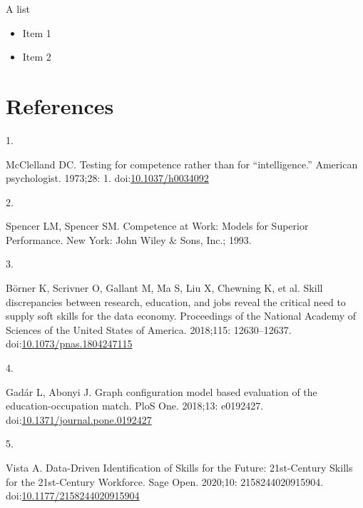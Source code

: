 \documentclass[10pt,letterpaper]{article}
\providecommand{\tightlist}{%
  \setlength{\itemsep}{0pt}\setlength{\parskip}{0pt}}
\newlength{\cslhangindent}
\newlength{\csllabelwidth}
\newenvironment{CSLReferences}[2] %
 {\begin{list}{}{%
  \setlength{\itemindent}{0pt}
  \setlength{\leftmargin}{0pt}
  \setlength{\parsep}{0pt}
  \ifodd #1
   \setlength{\leftmargin}{\cslhangindent}
   \setlength{\itemindent}{-1\cslhangindent}
  \fi
  \setlength{\itemsep}{#2\baselineskip}}}
 {\end{list}}
\newcommand{\CSLLeftMargin}[1]{\parbox[t]{\csllabelwidth}{#1}}
\newcommand{\CSLRightInline}[1]{\parbox[t]{\linewidth - \csllabelwidth}{#1}\break}
\begin{document}
A list

\begin{itemize}
\tightlist
\item
  Item 1
\item
  Item 2
\end{itemize}

\section*{References}\label{references}

\label{refs}
\begin{CSLReferences}{0}{1}
\CSLLeftMargin{1. }%
\CSLRightInline{McClelland DC. Testing for competence rather than for
{``intelligence.''} American psychologist. 1973;28: 1.
doi:\href{https://doi.org/10.1037/h0034092}{10.1037/h0034092}}

\CSLLeftMargin{2. }%
\CSLRightInline{Spencer LM, Spencer SM. {Competence at Work: Models for
Superior Performance}. New York: John Wiley \& Sons, Inc.; 1993. }

\CSLLeftMargin{3. }%
\CSLRightInline{Börner K, Scrivner O, Gallant M, Ma S, Liu X, Chewning
K, et al. Skill discrepancies between research, education, and jobs
reveal the critical need to supply soft skills for the data economy.
Proceedings of the National Academy of Sciences of the United States of
America. 2018;115: 12630--12637.
doi:\href{https://doi.org/10.1073/pnas.1804247115}{10.1073/pnas.1804247115}}

\CSLLeftMargin{4. }%
\CSLRightInline{Gadár L, Abonyi J. Graph configuration model based
evaluation of the education-occupation match. PloS One. 2018;13:
e0192427.
doi:\href{https://doi.org/10.1371/journal.pone.0192427}{10.1371/journal.pone.0192427}}

\CSLLeftMargin{5. }%
\CSLRightInline{Vista A. {Data-Driven Identification of Skills for the
Future: 21st-Century Skills for the 21st-Century Workforce}. Sage Open.
2020;10: 2158244020915904.
doi:\href{https://doi.org/10.1177/2158244020915904}{10.1177/2158244020915904}}

\end{CSLReferences}

\nolinenumbers
\end{document}

